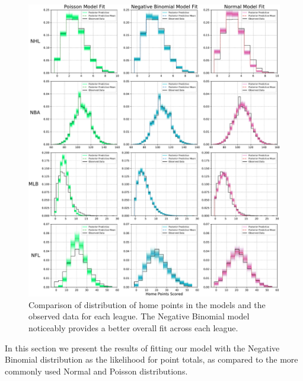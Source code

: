 \begin{figure}
	\centering
	\includegraphics[width=\textwidth]{figures/Figure_3.pdf}
	\caption{Comparison of distribution of home points in the models and the observed data for each league. The Negative Binomial model noticeably provides a better overall fit across each league.}
	\label{fig:comparisons}
\end{figure}

In this section we present the results of fitting our model with the Negative Binomial distribution as the likelihood for point totals, as compared to the more commonly used Normal and Poisson distributions.

